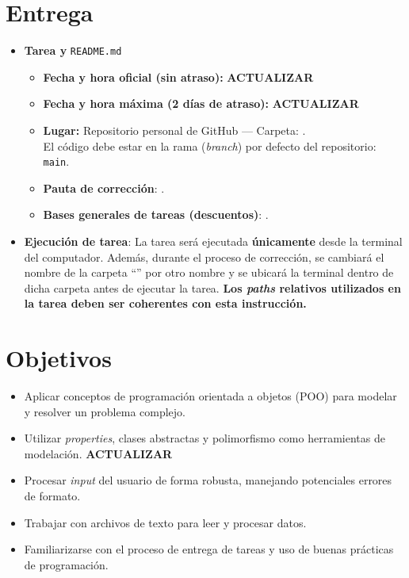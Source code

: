 \section*{Entrega}
\begin{itemize}
\item \textbf{Tarea y} \texttt{README.md}
  \begin{itemize}
      \item \textbf{Fecha y hora oficial (sin atraso):} \textbf{ACTUALIZAR}
      \item \textbf{Fecha y hora máxima (2 días de atraso):} \textbf{ACTUALIZAR}
      \item \textbf{Lugar:} Repositorio personal de GitHub --- Carpeta: \texttt{\folder}. \\ El código debe estar en la rama (\textit{branch}) por defecto del repositorio: \texttt{main}.
      
      \item \textbf{Pauta de corrección}: .
      
      \item \textbf{Bases generales de tareas (descuentos)}: .
  \end{itemize}

  \item \textbf{Ejecución de tarea}: La tarea será ejecutada \textbf{únicamente} desde la terminal del computador. Además, durante el proceso de corrección, se cambiará el nombre de la carpeta ``\texttt{\homeworkname{}}'' por otro nombre y se ubicará la terminal dentro de dicha carpeta antes de ejecutar la tarea. \textbf{Los \textit{paths} relativos utilizados en la tarea deben ser coherentes con esta instrucción.}

\end{itemize}

\section*{Objetivos}
\begin{itemize}
    \item Aplicar conceptos de programación orientada a objetos (POO) para modelar y resolver un problema complejo.
    
    \item Utilizar \textit{properties}, clases abstractas y polimorfismo como herramientas de modelación. \textbf{ACTUALIZAR}
    
    \item Procesar \textit{input} del usuario de forma robusta, manejando potenciales errores de formato.
    
    \item Trabajar con archivos de texto para leer y procesar datos.
    
    \item Familiarizarse con el proceso de entrega de tareas y uso de buenas prácticas de programación.
\end{itemize}

\clearpage
{
  \hypersetup{linkcolor=black}
  \small
  \tableofcontents
}
\clearpage